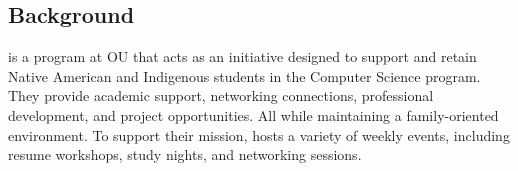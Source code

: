 \subsection{Background}
{\ClientName} is a program at OU that acts as an initiative designed to support
and retain Native American and Indigenous students in the Computer Science
program. They provide academic support, networking connections, professional
development, and project opportunities. All while maintaining a family-oriented
environment. To support their mission, {\ClientName} hosts a variety of weekly
events, including resume workshops, study nights, and networking sessions.
